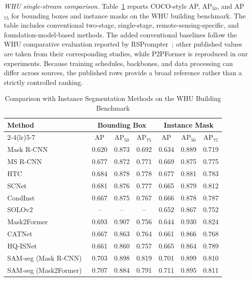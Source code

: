 \documentclass[letterpaper,journal]{IEEEtran}
\begin{document}
\noindent\textit{WHU single-stream comparison.}
\label{sec:whu}
Table~\ref{tab:whu} reports COCO-style AP, AP$_{50}$, and AP$_{75}$ for bounding boxes and instance masks on the WHU building benchmark. The table includes conventional two-stage, single-stage, remote-sensing-specific, and foundation-model-based methods. The added conventional baselines follow the WHU comparative evaluation reported by RSPrompter~\cite{ref_rsprompter}; other published values are taken from their corresponding studies, while P2PFormer is reproduced in our experiments. Because training schedules, backbones, and data processing can differ across sources, the published rows provide a broad reference rather than a strictly controlled ranking.

\begin{table}[!t]
\caption{Comparison with Instance Segmentation Methods on the WHU Building Benchmark}
\label{tab:whu}
\centering
\footnotesize
\begin{tabular}{lcccccc}
\toprule
\multirow{2}{*}{Method} & \multicolumn{3}{c}{Bounding Box} & \multicolumn{3}{c}{Instance Mask} \\
\cmidrule(lr){2-4}\cmidrule(lr){5-7}
& AP & AP$_{50}$ & AP$_{75}$ & AP & AP$_{50}$ & AP$_{75}$ \\
\midrule
Mask R-CNN~\cite{ref_maskrcnn} & 0.620 & 0.873 & 0.692 & 0.634 & 0.889 & 0.719 \\
MS R-CNN~\cite{ref_msrcnn} & 0.677 & 0.872 & 0.771 & 0.669 & 0.875 & 0.775 \\
HTC~\cite{ref_htc} & 0.684 & 0.878 & 0.778 & 0.677 & 0.881 & 0.783 \\
SCNet~\cite{ref_scnet} & 0.681 & 0.876 & 0.777 & 0.665 & 0.879 & 0.812 \\
CondInst~\cite{ref_condinst} & 0.667 & 0.875 & 0.767 & 0.666 & 0.878 & 0.787 \\
SOLOv2~\cite{ref_solov2} & -- & -- & -- & 0.652 & 0.867 & 0.752 \\
Mask2Former~\cite{ref_mask2former} & 0.693 & 0.907 & 0.756 & 0.644 & 0.930 & 0.824 \\
CATNet~\cite{ref_catnet} & 0.667 & 0.863 & 0.764 & 0.661 & 0.866 & 0.768 \\
HQ-ISNet~\cite{ref_hqisnet} & 0.661 & 0.860 & 0.757 & 0.665 & 0.864 & 0.789 \\
SAM-seg (Mask R-CNN)~\cite{ref_rsprompter} & 0.703 & 0.898 & 0.819 & 0.701 & 0.899 & 0.810 \\
SAM-seg (Mask2Former)~\cite{ref_rsprompter} & 0.707 & 0.884 & 0.791 & 0.711 & 0.895 & 0.811 \\

\end{tabular}
\end{table}
\end{document}
